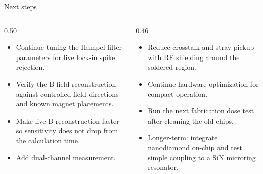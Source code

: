 \documentclass[aspectratio=169,10pt]{beamer}
\newcommand{\smallitemsep}{\setlength{\itemsep}{0.45em}}
\begin{document}
\begin{frame}{Next steps}
\begin{columns}[T,totalwidth=\textwidth]
\begin{column}{0.50\textwidth}
\begin{itemize}\smallitemsep
  \item Continue tuning the Hampel filter parameters for live lock-in spike rejection.
  \item Verify the B-field reconstruction against controlled field directions and known magnet placements.
  \item Make live B reconstruction faster so sensitivity does not drop from the calculation time.
  \item Add dual-channel measurement.
\end{itemize}
\end{column}
\begin{column}{0.46\textwidth}
\begin{itemize}\smallitemsep
  \item Reduce crosstalk and stray pickup with RF shielding around the soldered region.
  \item Continue hardware optimization for compact operation.
  \item Run the next fabrication dose test after cleaning the old chips.
  \item Longer-term: integrate nanodiamond on-chip and test simple coupling to a SiN microring resonator.
\end{itemize}
\end{column}
\end{columns}
\end{frame}
\end{document}
